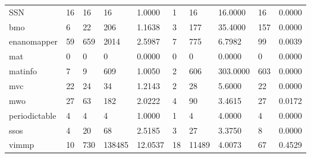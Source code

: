 \begin{tabular}{llllllllll}
SSN                     &                         16 &                         16 &              16 &         1.0000 &              1 &                16 &          16.0000 &               16 &       0.0000 \\
bmo                     &                          6 &                         22 &             206 &         1.1638 &              3 &               177 &          35.4000 &              157 &       0.0000 \\
enanomapper             &                         59 &                        659 &            2014 &         2.5987 &              7 &               775 &           6.7982 &               99 &       0.0039 \\
mat                     &                          0 &                          0 &               0 &         0.0000 &              0 &                 0 &           0.0000 &                0 &       0.0000 \\
matinfo                 &                          7 &                          9 &             609 &         1.0050 &              2 &               606 &         303.0000 &              603 &       0.0000 \\
mvc                     &                         22 &                         24 &              34 &         1.2143 &              2 &                28 &           5.6000 &               22 &       0.0000 \\
mwo                     &                         27 &                         63 &             182 &         2.0222 &              4 &                90 &           3.4615 &               27 &       0.0172 \\
periodictable           &                          4 &                          4 &               4 &         1.0000 &              1 &                 4 &           4.0000 &                4 &       0.0000 \\
ssos                    &                          4 &                         20 &              68 &         2.5185 &              3 &                27 &           3.3750 &                8 &       0.0000 \\
vimmp                   &                         10 &                        730 &          138485 &        12.0537 &             18 &             11489 &           4.0073 &               67 &       0.4529 \\
\bottomrule
\end{tabular}
